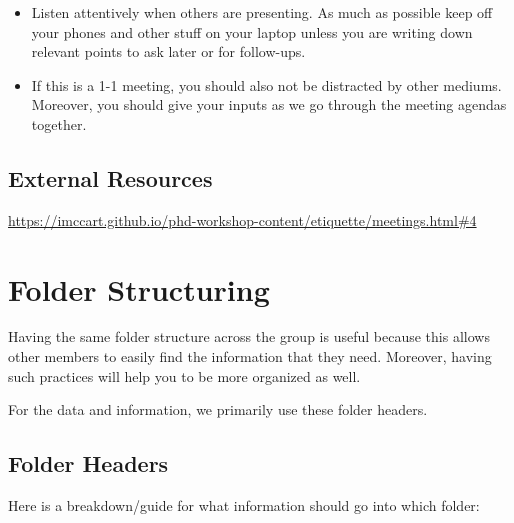\documentclass[
]{book}
\providecommand{\tightlist}{%
  \setlength{\itemsep}{0pt}\setlength{\parskip}{0pt}}
\begin{document}
\begin{enumerate}
  \begin{itemize}
  \tightlist
  \item
    Listen attentively when others are presenting. As much as possible keep off your phones and other stuff on your laptop unless you are writing down relevant points to ask later or for follow-ups.
  \item
    If this is a 1-1 meeting, you should also not be distracted by other mediums. Moreover, you should give your inputs as we go through the meeting agendas together.
  \end{itemize}
\end{enumerate}

\hypertarget{external-resources-3}{%
\section{External Resources}\label{external-resources-3}}

\url{https://imccart.github.io/phd-workshop-content/etiquette/meetings.html\#4}

\hypertarget{folder-structuring}{%
\chapter{\texorpdfstring{\textbf{Folder Structuring}}{Folder Structuring}}\label{folder-structuring}}

Having the same folder structure across the group is useful because this allows other members to easily find the information that they need. Moreover, having such practices will help you to be more organized as well.

For the data and information, we primarily use these folder headers.

\hypertarget{folder-headers}{%
\section{Folder Headers}\label{folder-headers}}

Here is a breakdown/guide for what information should go into which folder:
\end{document}
